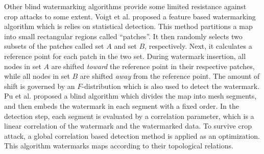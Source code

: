 Other blind watermarking algorithms
\cite{Vogit:2003,Schulz:2004,PuDJ06,Bird09:Shape,Kim11:copyright} 
provide some limited resistance against crop attacks to some extent. 
Voigt et al.\cite{Vogit:2003} 
proposed a feature based watermarking algorithm which is relies on statistical detection. 
This method partitions a map into small rectangular regions called ``patches''. 
It then randomly selects two subsets of the patches called set $A$ and set $B$,
respectively. Next, it calculates a reference point for each patch in the two set.
During watermark insertion, all nodes in set $A$ are shifted {\em toward} the reference point
in their respective patches, while all nodes in set $B$ are shifted {\em away} from
the reference point. The amount of shift is governed by an $F$-distribution 
\cite{abramowitz1965handbook}
which is also used to detect the watermark.
Pu et al. proposed a blind algorithm \cite{PuDJ06} which 
divides the map into mesh segments, and then
embeds the watermark in each segment with a fixed order. 
In the detection step, each segment is evaluated by a correlation parameter, which
is a linear correlation of the watermark and the watermarked data. 
To survive crop attack, a global correlation based detection method is 
applied as an optimization. This algorithm watermarks maps according to 
their topological relations. 

